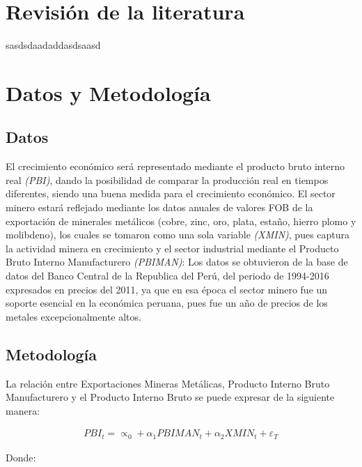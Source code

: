 \documentclass[11pt,]{article}
\begin{document}
\hypertarget{revision-de-la-literatura}{%
\section{Revisión de la literatura}\label{revision-de-la-literatura}}

sasdsdaadaddasdsaasd

\hypertarget{datos-y-metodologia}{%
\section{Datos y Metodología}\label{datos-y-metodologia}}

\hypertarget{datos}{%
\subsection{Datos}\label{datos}}

El crecimiento económico será representado mediante el producto bruto
interno real \emph{(PBI)}, dando la posibilidad de comparar la
producción real en tiempos diferentes, siendo una buena medida para el
crecimiento económico. El sector minero estará reflejado mediante los
datos anuales de valores FOB de la exportación de minerales metálicos
(cobre, zinc, oro, plata, estaño, hierro plomo y molibdeno), los cuales
se tomaron como una sola variable \emph{(XMIN)}, pues captura la
actividad minera en crecimiento y el sector industrial mediante el
Producto Bruto Interno Manufacturero \emph{(PBIMAN)}: Los datos se
obtuvieron de la base de datos del Banco Central de la Republica del
Perú, del periodo de 1994-2016 expresados en precios del 2011, ya que en
esa época el sector minero fue un soporte esencial en la económica
peruana, pues fue un año de precios de los metales excepcionalmente
altos.

\hypertarget{metodologia}{%
\subsection{Metodología}\label{metodologia}}

La relación entre Exportaciones Mineras Metálicas, Producto Interno
Bruto Manufacturero y el Producto Interno Bruto se puede expresar de la
siguiente manera:

\begin{eqnarray}\label{eq1}
PBI_t=\propto_0+\alpha_1PBIMAN_t+\alpha_2XMIN_t+\varepsilon_T     
\end{eqnarray}

Donde:
\end{document}
